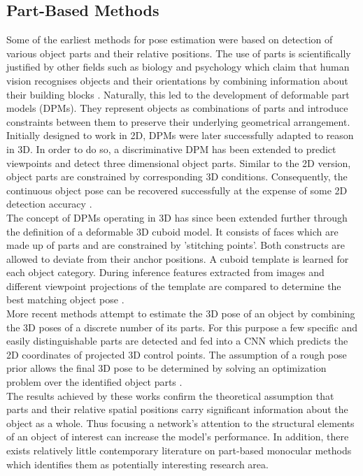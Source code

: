 \documentclass[main.tex]{subfiles}
\begin{document}
\subsection{Part-Based Methods}
\indent Some of the earliest methods for pose estimation were based on detection of various object parts and their relative positions. The use of parts is scientifically justified by other fields such as biology and psychology which claim that human vision recognises objects and their orientations by combining information about their building blocks \cite{Biederman1987}. Naturally, this led to the development of deformable part models (DPMs)\cite{Felzenszwalb2009}. They represent objects as combinations of parts and introduce constraints between them to preserve their underlying geometrical arrangement.\\
\indent Initially designed to work in 2D, DPMs were later successfully adapted to reason in 3D. In order to do so, a discriminative DPM has been extended to predict viewpoints and detect three dimensional object parts. Similar to the 2D version, object parts are constrained by corresponding 3D conditions. Consequently, the continuous object pose can be recovered successfully at the expense of some 2D detection accuracy \cite{Pepik2012}.\\
\indent The concept of DPMs operating in 3D has since been extended further through the definition of a deformable 3D cuboid model. It consists of faces which are made up of parts and are constrained by 'stitching points'. Both constructs are allowed to deviate from their anchor positions. A cuboid template is learned for each object category. During inference features extracted from images and different viewpoint projections of the template are compared to determine the best matching object pose \cite{Fidler2012}.\\
\indent More recent methods attempt to estimate the 3D pose of an object by combining the 3D poses of a discrete number of its parts. For this purpose a few specific and easily distinguishable parts are detected and fed into a CNN which predicts the 2D coordinates of projected 3D control points. The assumption of a rough pose prior allows the final 3D pose to be determined by solving an optimization problem over the identified object parts \cite{Crivellaro2018}. \\ 
\indent The results achieved by these works confirm the theoretical assumption that parts and their relative spatial positions carry significant information about the object as a whole. Thus focusing a network's attention to the structural elements of an object of interest can increase the model's performance. In addition, there exists relatively little contemporary literature on part-based monocular methods which identifies them as potentially interesting research area.
\end{document}
